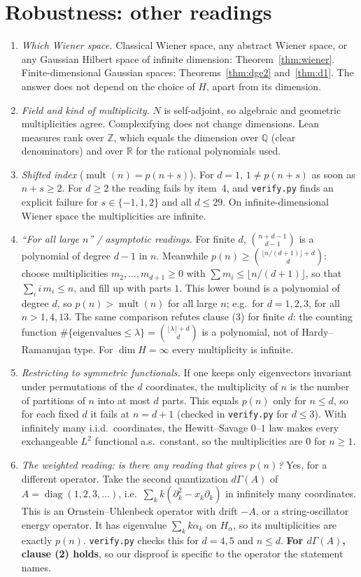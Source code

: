 \documentclass[11pt]{article}
\theoremstyle{definition}
\theoremstyle{remark}
\newcommand{\Z}{\mathbb{Z}}
\newcommand{\Q}{\mathbb{Q}}
\newcommand{\R}{\mathbb{R}}
\newcommand{\mult}{\operatorname{mult}}
\begin{document}
\section{Robustness: other readings}\label{sec:readings}
\begin{enumerate}
\item \emph{Which Wiener space.} Classical Wiener space, any abstract Wiener space, or
any Gaussian Hilbert space of infinite dimension: Theorem~\ref{thm:wiener}.
Finite-dimensional Gaussian spaces: Theorems~\ref{thm:dge2} and~\ref{thm:d1}. The
answer does not depend on the choice of $H$, apart from its dimension.
\item \emph{Field and kind of multiplicity.} $N$ is self-adjoint, so algebraic and
geometric multiplicities agree. Complexifying does not change dimensions. Lean
measures rank over $\Z$, which equals the dimension over $\Q$ (clear denominators)
and over $\R$ for the rational polynomials used.
\item \emph{Shifted index} ($\mult(n)=p(n+s)$). For $d=1$, $1\ne p(n+s)$ as soon as
$n+s\ge2$. For $d\ge2$ the reading fails by item~4, and \texttt{verify.py} finds an
explicit failure for $s\in\{-1,1,2\}$ and all $d\le29$. On infinite-dimensional
Wiener space the multiplicities are infinite.
\item \emph{``For all large $n$'' / asymptotic readings.} For finite $d$,
$\binom{n+d-1}{d-1}$ is a polynomial of degree $d-1$ in $n$. Meanwhile
$p(n)\ge\binom{\lfloor n/(d+1)\rfloor+d}{d}$: choose multiplicities
$m_2,\dots,m_{d+1}\ge0$ with $\sum m_i\le\lfloor n/(d+1)\rfloor$, so that
$\sum_i i\,m_i\le n$, and fill up with parts $1$. This lower bound is a polynomial
of degree $d$, so $p(n)>\mult(n)$ for all large $n$; e.g.\ for $d=1,2,3$, for all $n>1,4,13$.
The same comparison refutes clause (3) for finite $d$: the counting function
$\#\{\text{eigenvalues}\le\lambda\}=\binom{\lfloor\lambda\rfloor+d}{d}$ is a polynomial, not of
Hardy--Ramanujan type. For $\dim H=\infty$ every multiplicity is infinite.
\item \emph{Restricting to symmetric functionals.} If one keeps only eigenvectors
invariant under permutations of the $d$ coordinates, the multiplicity of $n$ is the
number of partitions of $n$ into at most $d$ parts. This equals $p(n)$ only for
$n\le d$, so for each fixed $d$ it fails at $n=d+1$ (checked in \texttt{verify.py} for
$d\le3$). With infinitely many i.i.d.\ coordinates, the Hewitt--Savage $0$--$1$ law makes
every exchangeable $L^2$ functional a.s.\ constant, so the multiplicities are $0$ for
$n\ge1$.
\item \emph{The weighted reading: is there any reading that gives $p(n)$?} Yes, for a
different operator. Take the second quantization $d\Gamma(A)$ of
$A=\operatorname{diag}(1,2,3,\dots)$, i.e.\ $\sum_k k(\partial_k^2-x_k\partial_k)$ in
infinitely many coordinates. This is an Ornstein--Uhlenbeck operator with drift $-A$, or a
string-oscillator energy operator. It has eigenvalue $\sum_kk\alpha_k$ on $H_\alpha$, so
its multiplicities are exactly $p(n)$. \texttt{verify.py} checks this for $d=4,5$ and
$n\le d$. \textbf{For $d\Gamma(A)$, clause (2) holds}, so our disproof is specific to the
operator the statement names.


\end{enumerate}
\end{document}
